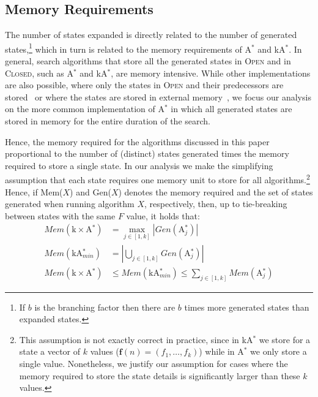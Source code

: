 \documentclass{aicom2e}
\newcommand{\astar}{A$^*$}
\newcommand{\kastar}{kA$^*$}
\newcommand{\kastarmin}{kA$^*_{min}$}
\newcommand{\kxastar}{k$\times$A$^*$}
\newcommand{\astari}[1]{A$^*_#1$}
\newcommand{\open}{\textsc{Open}}
\newcommand{\closed}{\textsc{Closed}}
\begin{document}
\subsection{Memory Requirements}
The number of states expanded is directly related to the number of generated
states,\footnote{If $b$ is the branching factor then there are $b$ times
more generated states than expanded states.} which in turn is related to the
memory requirements of \astar{} and \kastar{}. In general, search algorithms
that store all the generated states in \open{} and in \closed{}, such as
\astar{} and \kastar{}, are memory intensive. While other implementations are
also possible, where only the states in \open{} and their predecessors are
stored~\cite{zhou2006breadth,korf2004best} or where the states are stored in
external
memory~\cite{zhou2004structured,edelkamp2016external,edelkamp2005external}, we
focus our analysis on the more common implementation of \astar{} in which all
generated states are stored in memory for the entire duration of the search.

Hence, the memory required for the algorithms discussed in this paper
proportional to the number of (distinct) states generated times the memory
required to store a single state.
In our analysis we make the simplifying assumption that each state requires one
memory unit to store for all algorithms.\footnote{This assumption is not
exactly correct in practice, since in \kastar{} we store for a state a vector
of $k$ values ($\textbf{f}(n)=(f_1,\ldots,f_k)$)  while in \astar{} we only
store a single value. Nonetheless, we justify our assumption for cases where
the memory required to store the state details is significantly larger than
these $k$ values.} Hence, if Mem($X$) and Gen($X$) denotes the memory required
and the set of states generated when running algorithm $X$, respectively, then,
up to tie-breaking between states with the same $F$ value, it holds that:
\begin{align}
Mem(\text{\kxastar{}})&=\max_{j\in [1,k]}| Gen(\text{\astari{j}})| \label{eq:kxastar-mem}\\
Mem(\text{\kastarmin{}})&=|\bigcup_{j\in [1,k]} Gen(\text{\astari{j}})| \label{eq:kastar-mem}\\
Mem(\text{\kxastar{}})&\leq Mem(\text{\kastarmin{}}) \leq \sum_{j\in[1,k]} Mem(\text{\astari{j}}) \label{eq:kxastar-kastar-mem}
\end{align}
\end{document}
